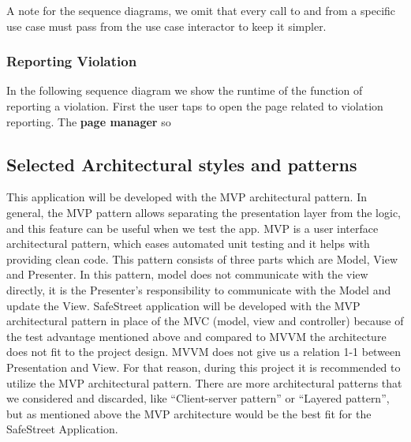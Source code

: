 A note for the sequence diagrams, we omit that every call to and from a specific use case must pass from the use case interactor to keep it simpler.

\subsubsection{Reporting Violation}

In the following sequence diagram we show the runtime of the function of reporting a violation.
First the user taps to open the page related to violation reporting. The \textbf{page manager} so







\subsection{Selected Architectural styles and patterns}


 \label{cleanArchiref}

This application will be developed with the MVP architectural pattern. In general, the MVP pattern allows separating the presentation layer from the logic, and this feature can be useful when we test the app. MVP is a user interface architectural pattern, which eases automated unit testing and it helps with providing clean code. This pattern consists of three parts which are Model, View and Presenter. In this pattern, model does not communicate with the view directly, it is the Presenter’s responsibility to communicate with the Model and update the View. SafeStreet application will be developed with the MVP architectural pattern in place of the MVC (model, view and controller) because of the test advantage mentioned above and compared to MVVM the architecture does not ﬁt to the project design. MVVM does not give us a relation 1-1 between Presentation and View. For that reason, during this project it is recommended to utilize the MVP architectural pattern. There are more architectural patterns that we considered and discarded, like “Client-server pattern” or “Layered pattern”, but as mentioned above the MVP architecture would be the best ﬁt for the SafeStreet Application.

